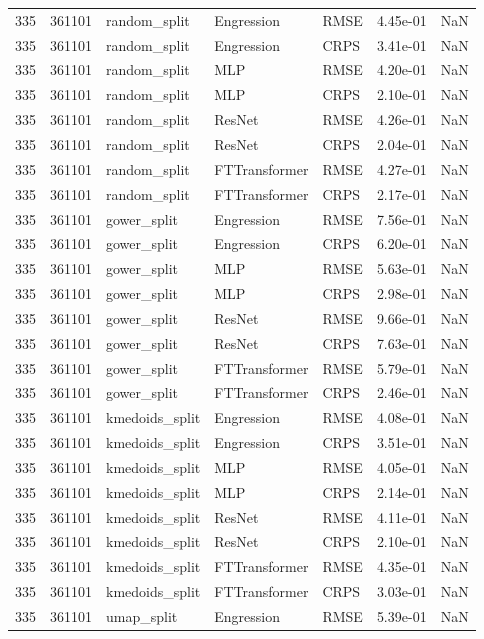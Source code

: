 \begin{tabular}{rrlllrr}
335 & 361101 & random\_split & Engression & RMSE & 4.45e-01 & NaN \\
335 & 361101 & random\_split & Engression & CRPS & 3.41e-01 & NaN \\
335 & 361101 & random\_split & MLP & RMSE & 4.20e-01 & NaN \\
335 & 361101 & random\_split & MLP & CRPS & 2.10e-01 & NaN \\
335 & 361101 & random\_split & ResNet & RMSE & 4.26e-01 & NaN \\
335 & 361101 & random\_split & ResNet & CRPS & 2.04e-01 & NaN \\
335 & 361101 & random\_split & FTTransformer & RMSE & 4.27e-01 & NaN \\
335 & 361101 & random\_split & FTTransformer & CRPS & 2.17e-01 & NaN \\
335 & 361101 & gower\_split & Engression & RMSE & 7.56e-01 & NaN \\
335 & 361101 & gower\_split & Engression & CRPS & 6.20e-01 & NaN \\
335 & 361101 & gower\_split & MLP & RMSE & 5.63e-01 & NaN \\
335 & 361101 & gower\_split & MLP & CRPS & 2.98e-01 & NaN \\
335 & 361101 & gower\_split & ResNet & RMSE & 9.66e-01 & NaN \\
335 & 361101 & gower\_split & ResNet & CRPS & 7.63e-01 & NaN \\
335 & 361101 & gower\_split & FTTransformer & RMSE & 5.79e-01 & NaN \\
335 & 361101 & gower\_split & FTTransformer & CRPS & 2.46e-01 & NaN \\
335 & 361101 & kmedoids\_split & Engression & RMSE & 4.08e-01 & NaN \\
335 & 361101 & kmedoids\_split & Engression & CRPS & 3.51e-01 & NaN \\
335 & 361101 & kmedoids\_split & MLP & RMSE & 4.05e-01 & NaN \\
335 & 361101 & kmedoids\_split & MLP & CRPS & 2.14e-01 & NaN \\
335 & 361101 & kmedoids\_split & ResNet & RMSE & 4.11e-01 & NaN \\
335 & 361101 & kmedoids\_split & ResNet & CRPS & 2.10e-01 & NaN \\
335 & 361101 & kmedoids\_split & FTTransformer & RMSE & 4.35e-01 & NaN \\
335 & 361101 & kmedoids\_split & FTTransformer & CRPS & 3.03e-01 & NaN \\
335 & 361101 & umap\_split & Engression & RMSE & 5.39e-01 & NaN \\

\end{tabular}
